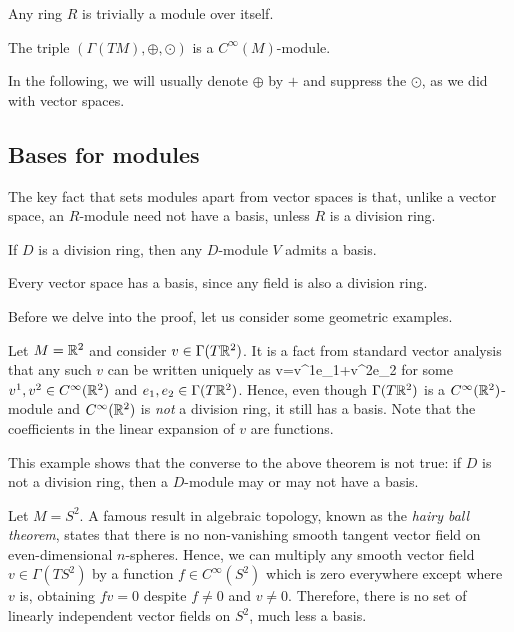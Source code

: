 \be
Any ring $R$ is trivially a module over itself.
\ee

\be
The triple $(\Gamma(TM),\oplus,\odot)$ is a $C^\infty(M)$-module.
\ee

In the following, we will usually denote $\oplus$ by $+$ and suppress the $\odot$, as we did with vector spaces.

\subsection{Bases for modules}

The key fact that sets modules apart from vector spaces is that, unlike a vector space, an $R$-module need not have a basis, unless $R$ is a division ring. 

\begin{theorem}
\label{thm:everybasis}
If $D$ is a division ring, then any $D$-module $V$ admits a basis.
\end{theorem}

\bc
Every vector space has a basis, since any field is also a division ring.
\ec

Before we delve into the proof, let us consider some geometric examples.

\be
\ben[label=\alph*)]
\item Let $M = \mathbb{R}^2$ and consider $v\in \Gamma(T\mathbb{R}^2)$. It is a fact from standard vector analysis that any such $v$ can be written uniquely as
\bse
v=v^1e_1+v^2e_2
\ese
for some $v^1,v^2\in C^\infty(\mathbb{R}^2)$ and $e_1,e_2\in \Gamma(T\mathbb{R}^2)$. Hence, even though $\Gamma(T\mathbb{R}^2)$ is a $C^\infty(\mathbb{R}^2)$-module and $C^\infty(\mathbb{R}^2)$ is \emph{not} a division ring, it still has a basis. Note that the coefficients in the linear expansion of $v$ are functions.

This example shows that the converse to the above theorem is not true: if $D$ is not a division ring, then a $D$-module may or may not have a basis.

\item Let $M=S^2$. A famous result in algebraic topology, known as the \emph{hairy ball theorem}, states that there is no non-vanishing smooth tangent vector field on even-dimensional $n$-spheres. Hence, we can multiply any smooth vector field $v\in\Gamma(TS^2)$ by a function $f\in C^\infty(S^2)$ which is zero everywhere except where $v$ is, obtaining $fv=0$ despite $f\neq 0$ and $v\neq 0$. Therefore, there is no set of linearly independent vector fields on $S^2$, much less a basis.
\een
\ee


